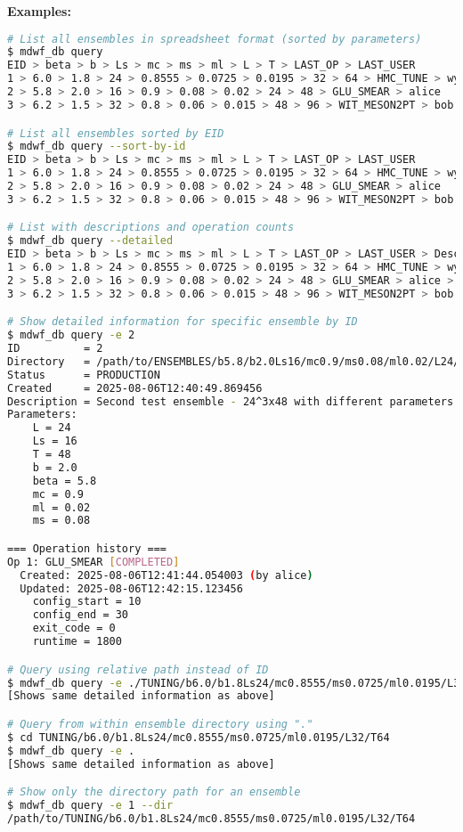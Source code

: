 \documentclass{article}
\begin{document}
\textbf{Examples:}
\begin{lstlisting}[language=bash]
# List all ensembles in spreadsheet format (sorted by parameters)
$ mdwf_db query
EID > beta > b > Ls > mc > ms > ml > L > T > LAST_OP > LAST_USER
1 > 6.0 > 1.8 > 24 > 0.8555 > 0.0725 > 0.0195 > 32 > 64 > HMC_TUNE > wyatt
2 > 5.8 > 2.0 > 16 > 0.9 > 0.08 > 0.02 > 24 > 48 > GLU_SMEAR > alice
3 > 6.2 > 1.5 > 32 > 0.8 > 0.06 > 0.015 > 48 > 96 > WIT_MESON2PT > bob

# List all ensembles sorted by EID
$ mdwf_db query --sort-by-id
EID > beta > b > Ls > mc > ms > ml > L > T > LAST_OP > LAST_USER
1 > 6.0 > 1.8 > 24 > 0.8555 > 0.0725 > 0.0195 > 32 > 64 > HMC_TUNE > wyatt
2 > 5.8 > 2.0 > 16 > 0.9 > 0.08 > 0.02 > 24 > 48 > GLU_SMEAR > alice
3 > 6.2 > 1.5 > 32 > 0.8 > 0.06 > 0.015 > 48 > 96 > WIT_MESON2PT > bob

# List with descriptions and operation counts
$ mdwf_db query --detailed
EID > beta > b > Ls > mc > ms > ml > L > T > LAST_OP > LAST_USER > Description > Operations
1 > 6.0 > 1.8 > 24 > 0.8555 > 0.0725 > 0.0195 > 32 > 64 > HMC_TUNE > wyatt > First test ensemble - 32^3x64 > 3
2 > 5.8 > 2.0 > 16 > 0.9 > 0.08 > 0.02 > 24 > 48 > GLU_SMEAR > alice > Second test ensemble - 24^3x48 > 1
3 > 6.2 > 1.5 > 32 > 0.8 > 0.06 > 0.015 > 48 > 96 > WIT_MESON2PT > bob > Large production ensemble - 48^3x96 > 2

# Show detailed information for specific ensemble by ID
$ mdwf_db query -e 2
ID          = 2
Directory   = /path/to/ENSEMBLES/b5.8/b2.0Ls16/mc0.9/ms0.08/ml0.02/L24/T48
Status      = PRODUCTION
Created     = 2025-08-06T12:40:49.869456
Description = Second test ensemble - 24^3x48 with different parameters
Parameters:
    L = 24
    Ls = 16
    T = 48
    b = 2.0
    beta = 5.8
    mc = 0.9
    ml = 0.02
    ms = 0.08

=== Operation history ===
Op 1: GLU_SMEAR [COMPLETED]
  Created: 2025-08-06T12:41:44.054003 (by alice)
  Updated: 2025-08-06T12:42:15.123456
    config_start = 10
    config_end = 30
    exit_code = 0
    runtime = 1800

# Query using relative path instead of ID
$ mdwf_db query -e ./TUNING/b6.0/b1.8Ls24/mc0.8555/ms0.0725/ml0.0195/L32/T64
[Shows same detailed information as above]

# Query from within ensemble directory using "."
$ cd TUNING/b6.0/b1.8Ls24/mc0.8555/ms0.0725/ml0.0195/L32/T64
$ mdwf_db query -e .
[Shows same detailed information as above]

# Show only the directory path for an ensemble
$ mdwf_db query -e 1 --dir
/path/to/TUNING/b6.0/b1.8Ls24/mc0.8555/ms0.0725/ml0.0195/L32/T64
\end{lstlisting}
\end{document}
